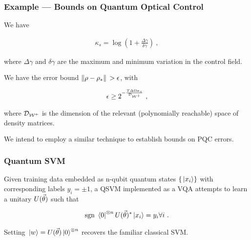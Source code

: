 \begin{frame}
    \frametitle{Example --- Bounds on Quantum Optical Control}
    
    We have

    \begin{gather*}
        \kappa_s = \log (1 + \frac{\Delta\gamma}{\delta\gamma})~,
    \end{gather*}

    where \(\Delta\gamma\) and \(\delta\gamma\) are the maximum and minimum
    variation in the control field.

    We have the error bound \cite{lloyd2014information} \(\norm*{\rho-\rho_*} >
    \epsilon\), with

    \begin{gather*}
        \epsilon \geq 2^{-\frac{T\Delta\Omega\kappa_s}{\mathcal{D}_{\mathcal{W^+}}}}~,
    \end{gather*}

    where \(\mathcal{D}_{\mathcal{W^+}}\) is the dimension of the relevant
    (polynomially reachable) space of density matrices.

    We intend to employ a similar technique to establish bounds on PQC errors.

\end{frame}

\begin{frame}
    \frametitle{Quantum SVM}

    Given training data embedded as n-qubit quantum states \(\{\ket*{x_i}\}\) with
    corresponding labels \({y_i = \pm 1}\), a QSVM implemented as a VQA attempts to learn a
    unitary \(U(\vec{\theta})\) such that

    \begin{equation*}
        \text{sgn }{\bra*{0}^{\otimes n}U(\vec{\theta})^*\ket*{x_i}} = y_i \forall i~.
    \end{equation*}

    Setting \(\ket*{w} = U(\vec{\theta})\ket*{0}^{\otimes n}\) recovers the
    familiar classical SVM.

\end{frame}

